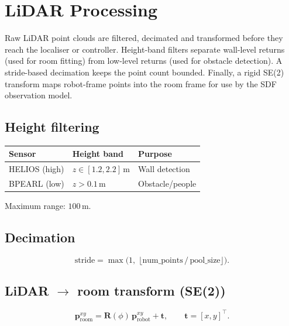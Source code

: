 \documentclass[a4paper, 11pt]{article}
\newcommand{\vect}[1]{\bm{#1}}
\newcommand{\mat}[1]{\bm{#1}}
\begin{document}
\section{LiDAR Processing}\label{sec:lidar}

Raw LiDAR point clouds are filtered, decimated and transformed before
they reach the localiser or controller.  Height-band filters separate
wall-level returns (used for room fitting) from low-level returns (used
for obstacle detection).  A stride-based decimation keeps the point
count bounded.  Finally, a rigid SE(2) transform maps robot-frame
points into the room frame for use by the SDF observation model.

\subsection{Height filtering}

\begin{center}
\begin{tabular}{lll}
  \toprule
  Sensor & Height band & Purpose \\
  \midrule
  HELIOS (high) & $z \in [1.2, 2.2]\,$m & Wall detection \\
  BPEARL (low)  & $z > 0.1\,$m          & Obstacle/people \\
  \bottomrule
\end{tabular}
\end{center}
Maximum range: $100\,$m.

\subsection{Decimation}

\begin{equation}
  \text{stride}
  = \max\!\bigl(1,\;
    \lfloor\text{num\_points}\,/\,\text{pool\_size}\rfloor\bigr).
\end{equation}

\subsection{LiDAR $\to$ room transform (SE(2))}

\begin{equation}
  \vect{p}_{\text{room}}^{xy}
  = \mat{R}(\phi)\,\vect{p}_{\text{robot}}^{xy} + \vect{t},
  \qquad
  \vect{t} = [x, y]^\top.
\end{equation}
\end{document}
